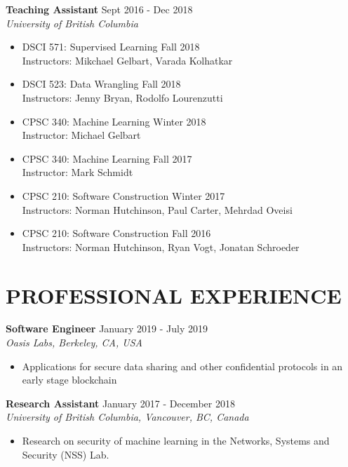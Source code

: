 \documentclass[10pt]{res} %
\begin{document}
\textbf{Teaching Assistant} \hfill Sept 2016 - Dec 2018 \\
{\sl University of British Columbia } \\
\begin{itemize}    
    \item DSCI 571: Supervised Learning \hfill Fall 2018 \\
    Instructors: Mikchael Gelbart, Varada Kolhatkar
    \item DSCI 523: Data Wrangling \hfill Fall 2018 \\
    Instructors: Jenny Bryan, Rodolfo Lourenzutti
    \item CPSC 340: Machine Learning \hfill Winter 2018 \\
    Instructor: Michael Gelbart
    \item CPSC 340: Machine Learning \hfill Fall 2017 \\
    Instructor: Mark Schmidt
    \item CPSC 210: Software Construction \hfill Winter 2017 \\
    Instructors: Norman Hutchinson, Paul Carter, Mehrdad Oveisi
    \item CPSC 210: Software Construction \hfill Fall 2016 \\
    Instructors: Norman Hutchinson, Ryan Vogt, Jonatan Schroeder
\end{itemize}


\section{PROFESSIONAL EXPERIENCE} 

\vspace{0.2in} %

\textbf{Software Engineer} \hfill January 2019 - July 2019 \\
{\sl Oasis Labs, Berkeley, CA, USA }
\begin{itemize}  %
    \item Applications for secure data sharing and other confidential protocols in an early stage blockchain
\end{itemize}

\textbf{Research Assistant} \hfill January 2017 - December 2018 \\
{\sl University of British Columbia, Vancouver, BC, Canada }
\begin{itemize}  %
    \item Research on security of machine learning in the Networks, Systems and Security (NSS) Lab.
\end{itemize}
\end{document}
